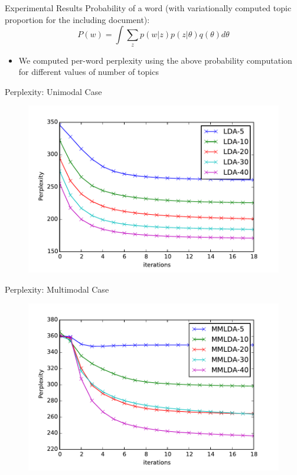 \documentclass[pdf]{beamer}
\begin{document}
\begin{frame}{Experimental Results}
	Probability of a word (with variationally computed topic proportion for the including document):
	\begin{equation*}
	 	P(w) = \int \sum_z p(w|z) p(z|\theta)q(\theta)d\theta
	\end{equation*}
	\begin{itemize}
		\item We computed per-word perplexity using the above probability computation for different values of number of topics
	\end{itemize}
	
\end{frame}

\begin{frame}{Perplexity: Unimodal Case}
\begin{figure}
\label{fig:perpuni}
\includegraphics*[width=\textwidth]{perplex-uni.pdf}
\end{figure}
\end{frame}

\begin{frame}{Perplexity: Multimodal Case}
\begin{figure}
\label{fig:perpmulti}
\includegraphics*[width=\textwidth]{perplex-mm.pdf}
\end{figure}
\end{frame}
\end{document}
